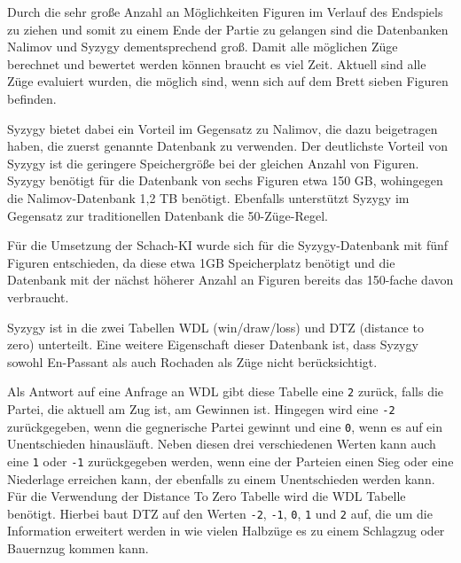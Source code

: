 Durch die sehr große Anzahl an Möglichkeiten Figuren im Verlauf des
Endspiels zu ziehen und somit zu einem Ende der Partie zu gelangen sind
die Datenbanken Nalimov und Syzygy dementsprechend groß. Damit alle
möglichen Züge berechnet und bewertet werden können braucht es viel
Zeit. Aktuell sind alle Züge evaluiert wurden, die möglich sind, wenn
sich auf dem Brett sieben Figuren befinden.

Syzygy bietet dabei ein Vorteil im Gegensatz zu Nalimov, die dazu
beigetragen haben, die zuerst genannte Datenbank zu verwenden. Der
deutlichste Vorteil von Syzygy ist die geringere Speichergröße bei der
gleichen Anzahl von Figuren. Syzygy benötigt für die Datenbank von sechs
Figuren etwa 150 GB, wohingegen die Nalimov-Datenbank 1,2 TB benötigt.
Ebenfalls unterstützt Syzygy im Gegensatz zur traditionellen Datenbank
die 50-Züge-Regel.

Für die Umsetzung der Schach-KI wurde sich für die Syzygy-Datenbank mit
fünf Figuren entschieden, da diese etwa 1GB Speicherplatz benötigt und
die Datenbank mit der nächst höherer Anzahl an Figuren bereits das
150-fache davon verbraucht.

Syzygy ist in die zwei Tabellen WDL (win/draw/loss) und DTZ (distance to
zero) unterteilt. Eine weitere Eigenschaft dieser Datenbank ist, dass
Syzygy sowohl En-Passant als auch Rochaden als Züge nicht
berücksichtigt.

Als Antwort auf eine Anfrage an WDL gibt diese Tabelle eine \texttt{2}
zurück, falls die Partei, die aktuell am Zug ist, am Gewinnen ist.
Hingegen wird eine \texttt{-2} zurückgegeben, wenn die gegnerische
Partei gewinnt und eine \texttt{0}, wenn es auf ein
Unentschieden hinausläuft. Neben diesen drei verschiedenen Werten kann
auch eine \texttt{1} oder \texttt{-1} zurückgegeben werden, wenn eine
der Parteien einen Sieg oder eine Niederlage erreichen kann, der
ebenfalls zu einem Unentschieden werden kann. Für die Verwendung der
Distance To Zero Tabelle wird die WDL Tabelle benötigt. Hierbei baut DTZ
auf den Werten \texttt{-2}, \texttt{-1}, \texttt{0}, \texttt{1} und
\texttt{2} auf, die um die Information erweitert werden in wie vielen
Halbzüge es zu einem Schlagzug oder Bauernzug kommen kann.

